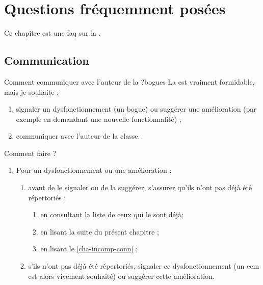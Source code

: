 \chapter{Questions fréquemment posées}\label{cha-faq}

Ce chapitre est une \gls{faq}  sur la \yatCl{}.

\section{Communication}
\label{sec-communication}

\begin{dbfaq}{Comment communiquer avec l'auteur de la \yatCl{} ?}{bogues}
  La \yatCl{} est vraiment formidable, mais je souhaite :
  \begin{enumerate}
  \item signaler un dysfonctionnement (un bogue) ou suggérer une amélioration
    (par exemple en demandant une nouvelle fonctionnalité) ;
  \item communiquer avec l'auteur de la classe.
  \end{enumerate}
  Comment faire ?
  \tcblower
  \begin{enumerate}
  \item Pour un dysfonctionnement ou une amélioration :
    \begin{enumerate}
    \item avant de le signaler ou de la suggérer, s'assurer qu'ils n'ont pas
      déjà été répertoriés :
      \begin{enumerate}
      \item en consultant la liste de ceux qui le sont déjà\issues ;
      \item en lisant la suite du présent chapitre ;
      \item en lisant le \vref{cha-incomp-conn} ;
      \end{enumerate}
    \item s'ils n'ont pas déjà été répertoriés, signaler ce dysfonctionnement
      (un \gls{ecm} est alors vivement souhaité) ou suggérer cette
      amélioration\newissues{}.
    \end{enumerate}

\end{enumerate}
\end{dbfaq}
